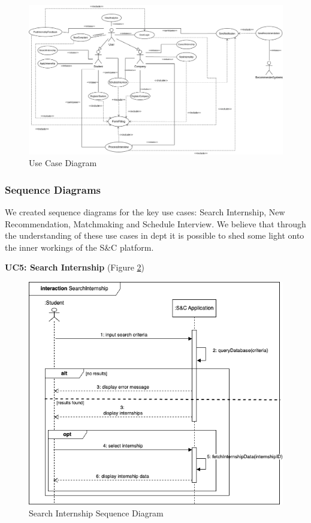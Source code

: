 \begin{figure}[H]
\centering
\includegraphics[width=\textwidth]{Images/use_case_diagram.png}
\caption{\label{fig:use-case-diagram} Use Case Diagram}
\end{figure}

\clearpage
\subsubsection{Sequence Diagrams}
We created sequence diagrams for the key use cases: Search Internship, New Recommendation, Matchmaking and Schedule Interview. We believe that through the understanding of these use cases in dept it is possible to shed some light onto the inner workings of the S\&C platform.

\textbf{UC5: Search Internship} (Figure \ref{fig:search_sequence})
\begin{figure}[H]
\centering
\includegraphics[width=\textwidth]{Images/searchInternship-sequence.png}
\caption{\label{fig:search_sequence} Search Internship Sequence Diagram}
\end{figure}

